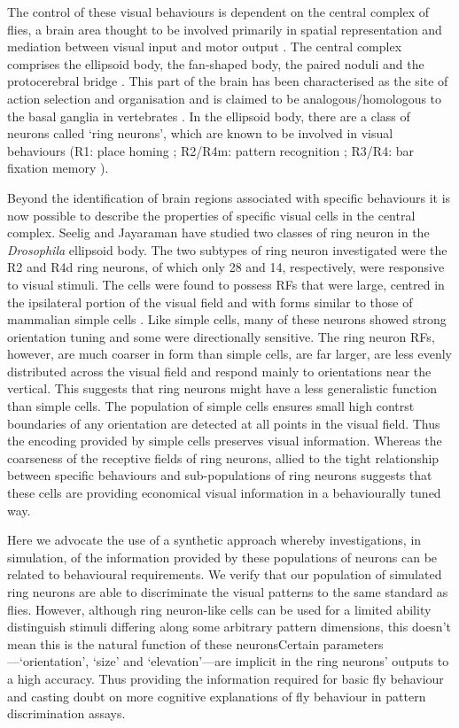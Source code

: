 The control of these visual behaviours is dependent on the central complex of flies, a brain area thought to be involved primarily in spatial representation and mediation between visual input and motor output \cite{Pfeiffer2014}.
The central complex comprises the ellipsoid body, the fan-shaped body, the paired noduli and the protocerebral bridge \cite{Young2010}.
This part of the brain has been characterised as the site of action selection and organisation and is claimed to be analogous/homologous to the basal ganglia in vertebrates \cite{Strausfeld2013}.
In the ellipsoid body, there are a class of neurons called `ring neurons', which are known to be involved in visual behaviours (R1: place homing \cite{Ofstad2011,Sitaraman2010,Sitaraman2008}; R2/R4m: pattern recognition \cite{Pan2009,Liu2006,Ernst1999}; R3/R4: bar fixation memory \cite{Neuser2008}).

Beyond the identification of brain regions associated with specific behaviours it is now possible to describe the properties of specific visual cells in the central complex. Seelig and Jayaraman \cite{Seelig2013} have studied two classes of ring neuron in the \emph{Drosophila} ellipsoid body.
The two subtypes of ring neuron investigated were the R2 and R4d ring neurons, of which only 28 and 14, respectively, were responsive to visual stimuli.
The cells were found to possess \acp{RF} that were large, centred in the ipsilateral portion of the visual field and with forms similar to those of mammalian simple cells \cite{Hubel1962}.
Like simple cells, many of these neurons showed strong orientation tuning and some were directionally sensitive.
The ring neuron \acp{RF}, however, are much coarser in form than simple cells, are far larger, are less evenly distributed across the visual field and respond mainly to orientations near the vertical.
This suggests that ring neurons might have a less generalistic function than simple cells. The population of simple cells ensures small high contrst boundaries of any orientation are detected at all points in the visual field. Thus the encoding provided by simple cells preserves visual information. Whereas the coarseness of the receptive fields of ring neurons, allied to the tight relationship between specific behaviours and sub-populations of ring neurons suggests that these cells are providing economical visual information in a behaviourally tuned way.

Here we advocate the use of a synthetic approach whereby investigations, in simulation, of the information provided by these populations of neurons can be related to behavioural requirements. We verify that our population of simulated ring neurons are able to discriminate the visual patterns to the same standard as flies.
However, although ring neuron-like cells can be used for a limited ability distinguish stimuli differing along some arbitrary pattern dimensions, this doesn't mean this is the natural function of these neuronsCertain parameters---`orientation', `size' and `elevation'---are implicit in the ring neurons' outputs to a high accuracy. Thus providing the information required for basic fly behaviour and casting doubt on more cognitive explanations of fly behaviour in pattern discrimination assays.
 



